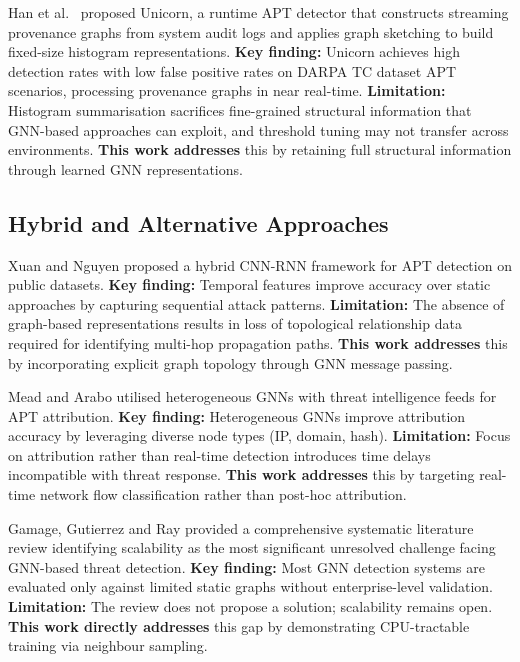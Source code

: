 \documentclass[conference]{IEEEtran}
\begin{document}
Han et al.~\cite{han2020} proposed Unicorn, a runtime APT detector that
constructs streaming provenance graphs from system audit logs and applies graph
sketching to build fixed-size histogram representations. \textbf{Key finding:}
Unicorn achieves high detection rates with low false positive rates on DARPA TC
dataset APT scenarios, processing provenance graphs in near real-time.
\textbf{Limitation:} Histogram summarisation sacrifices fine-grained structural
information that GNN-based approaches can exploit, and threshold tuning may not
transfer across environments. \textbf{This work addresses} this by retaining
full structural information through learned GNN representations.

\subsection{Hybrid and Alternative Approaches}

Xuan and Nguyen \cite{xuan2024} proposed a hybrid CNN-RNN framework for APT
detection on public datasets. \textbf{Key finding:} Temporal features improve
accuracy over static approaches by capturing sequential attack patterns.
\textbf{Limitation:} The absence of graph-based representations results in loss
of topological relationship data required for identifying multi-hop propagation
paths. \textbf{This work addresses} this by incorporating explicit graph
topology through GNN message passing.

Mead and Arabo \cite{mead2025} utilised heterogeneous GNNs with threat
intelligence feeds for APT attribution. \textbf{Key finding:} Heterogeneous
GNNs improve attribution accuracy by leveraging diverse node types (IP, domain,
hash). \textbf{Limitation:} Focus on attribution rather than real-time
detection introduces time delays incompatible with threat response.
\textbf{This work addresses} this by targeting real-time network flow
classification rather than post-hoc attribution.

Gamage, Gutierrez and Ray \cite{gamage2025} provided a comprehensive systematic
literature review identifying scalability as the most significant unresolved
challenge facing GNN-based threat detection. \textbf{Key finding:} Most GNN
detection systems are evaluated only against limited static graphs without
enterprise-level validation. \textbf{Limitation:} The review does not propose
a solution; scalability remains open. \textbf{This work directly addresses}
this gap by demonstrating CPU-tractable training via neighbour sampling.
\end{document}
